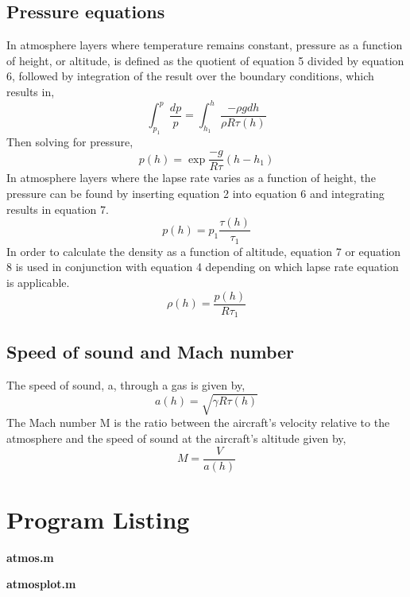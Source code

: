 \documentclass[12pt]{report}
\begin{document}
\subsection{Pressure equations}
In atmosphere layers where temperature remains constant, pressure as a function of height, or altitude, is defined as the quotient of equation 5 divided by equation 6, followed by integration of the result over the boundary conditions, which results in,
\begin{equation}
	\int^p_{p_{1}}{\frac{dp}{p}} = \int^h_{h_{1}}{\frac{-\rho gdh}{\rho R \tau (h)}}
	\label{equation:intpressure}
\end{equation}
Then solving for pressure,
\begin{equation}
	p(h) = \exp{\frac{-g}{R\tau}(h-h_{1})}
	\label{equation:pressureh}
\end{equation}
In atmosphere layers where the lapse rate varies as a function of height, the pressure can be found by inserting equation 2 into equation 6 and integrating results in equation 7.
\begin{equation}
	p(h) = p_{1}\frac{\tau (h)}{\tau_1}
	\label{equation:pressureh2}
\end{equation}
In order to calculate the density as a function of altitude, equation 7 or equation 8 is used in conjunction with equation 4 depending on which lapse rate equation is applicable.
\begin{equation}
	\rho(h) = \frac{p(h)}{R\tau_1}
	\label{equation:equation8}
\end{equation}
\subsection{Speed of sound and Mach number}
The speed of sound, a, through a gas is given by,
\begin{equation}
	a(h) = \sqrt{\gamma R \tau (h)}
	\label{equation:equation9}
\end{equation}
The Mach number M is the ratio between the aircraft's velocity relative to the atmosphere and the speed of sound at the aircraft's altitude given by,
\begin{equation}
	M = \frac{V}{a(h)}
	\label{equation:equation6}
\end{equation}




\section{Program Listing}
\textbf{atmos.m}

\textbf{atmosplot.m}

\end{document}

